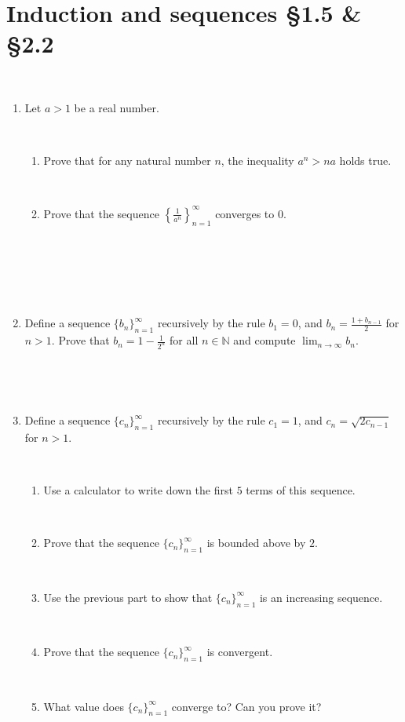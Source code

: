 \documentclass[12pt]{amsart}
\newcommand{\N}{\mathbb{N}}
\begin{document}
	
	\thispagestyle{empty}
	
	\section*{Induction and sequences \S1.5 \& \S 2.2}

	\

\begin{enumerate}


\item Let $a>1$ be a real number. 

\

\begin{enumerate}
\item Prove that for any natural number $n$, the inequality $a^n > na$ holds true.

\

\item Prove that the sequence  $\left\{ \frac{1}{a^n} \right\}_{n=1}^\infty$ converges to $0$. 

\

\end{enumerate}

\

\

\item Define a sequence $\{ b_n\}_{n=1}^\infty$ recursively by the rule $b_1=0$, and $\displaystyle b_{n} = \frac{1+ b_{n-1}}{2}$ for $n>1$. Prove that $\displaystyle b_n = 1 - \frac{1}{2^n}$ for all $n\in \N$ and compute $\displaystyle\lim_{n\to \infty} b_n$.

\

\

\item Define a sequence $\{ c_n\}_{n=1}^\infty$ recursively by the rule $c_1=1$, and $\displaystyle c_{n} = \sqrt{2 c_{n-1}}$ for $n>1$. 

\

\begin{enumerate}
\item Use a calculator to write down the first $5$ terms of this sequence.

\


\item Prove that the sequence $\{c_n\}_{n=1}^\infty$ is bounded above by $2$.

\

\item Use the previous part to show that $\{c_n\}_{n=1}^\infty$ is an increasing sequence.

\

\item Prove that the sequence $\{c_n\}_{n=1}^\infty$ is convergent.

\

\item What value does $\{c_n\}_{n=1}^\infty$ converge to? Can you prove it?
\end{enumerate}







\end{enumerate}
\end{document}

